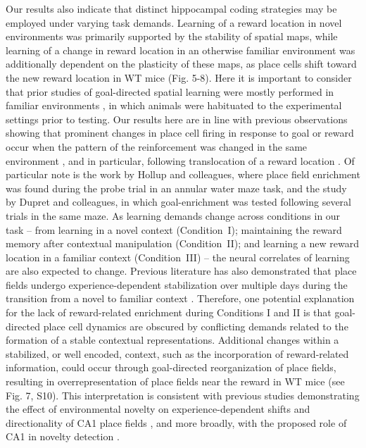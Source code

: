 Our results also indicate that distinct hippocampal coding strategies may be employed under varying task demands. Learning of a reward location in novel environments was primarily supported by the stability of spatial maps, while learning of a change in reward location in an otherwise familiar environment was additionally dependent on the plasticity of these maps, as place cells shift toward the new reward location in WT mice (Fig. 5-8). Here it is important to consider that prior studies of goal-directed spatial learning were mostly performed in familiar environments \citep{Breese1989}\citep{Dupret2010a}\citep{Fyhn2002}\citep{Hok2007}\citep{Hollup2001b}\citep{Kobayashi1997}, in which animals were habituated to the experimental settings prior to testing. Our results here are in line with previous observations showing that prominent changes in place cell firing in response to goal or reward occur when the pattern of the reinforcement was changed in the same environment \citep{Breese1989}\citep{Fyhn2002}\citep{Kobayashi1997}\citep{Markus1995}, and in particular, following translocation of a reward location \citep{Breese1989}\citep{Kobayashi1997}. Of particular note is the work by Hollup and colleagues, where place field enrichment was found during the probe trial in an annular water maze task, and the study by Dupret and colleagues, in which goal-enrichment was tested following several trials in the same maze. As learning demands change across conditions in our task – from learning in a novel context (Condition~I); maintaining the reward memory after contextual manipulation (Condition~II); and learning a new reward location in a familiar context (Condition~III) – the neural correlates of learning are also expected to change. Previous literature has also demonstrated that place fields undergo experience-dependent stabilization over multiple days during the transition from a novel to familiar context \citep{Cacucci2007}\citep{Frank2004}\citep{Hill1978}\citep{Karlsson2008}\citep{Leutgeb2004}\citep{Wilson1993}. Therefore, one potential explanation for the lack of reward-related enrichment during Conditions I and II is that goal-directed place cell dynamics are obscured by conflicting demands related to the formation of a stable contextual representations. Additional changes within a stabilized, or well encoded, context, such as the incorporation of reward-related information, could occur through goal-directed reorganization of place fields, resulting in overrepresentation of place fields near the reward in WT mice (see Fig. 7, S10). This interpretation is consistent with previous studies demonstrating the effect of environmental novelty on experience-dependent shifts and directionality of CA1 place fields \citep{Mehta1997}\citep{Navratilova2012}\citep{Roth2012}\citep{Lee2007}, and more broadly, with the proposed role of CA1 in novelty detection \citep{Duncan2012}\citep{Karlsson2008}\citep{Larkin2014}\citep{Nitz2004}\citep{Vinogradova2001}\citep{Lever2002a}.

